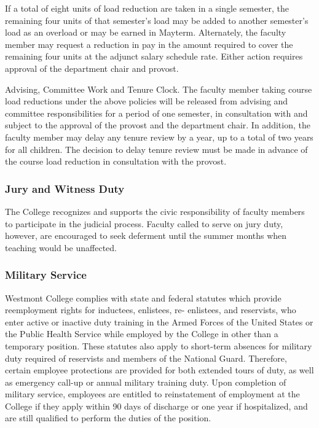 				If a total of eight units of load reduction are taken in a single semester, the remaining four units of that semester's load may be added to another semester's load as an overload or may be earned in Mayterm. Alternately, the faculty member may request a reduction in pay in the amount required to cover the remaining four units at the adjunct salary schedule rate. Either action requires approval of the department chair and provost.

				Advising, Committee Work and Tenure Clock.  The faculty member taking course load reductions under the above policies will be released from advising and committee responsibilities for a period of one semester, in consultation with and subject to the approval of the provost and the department chair. In addition, the faculty member may delay any tenure review by a year, up to a total of two years for all children.  The decision to delay tenure review must be made in advance of the course load reduction in consultation with the provost.

		\subsubsection{Jury and Witness Duty}
			The College recognizes and supports the civic responsibility of faculty members to participate in the judicial process.  Faculty called to serve on jury duty, however, are encouraged to seek deferment until the summer months when teaching would be unaffected.

		\subsubsection{Military Service}
			Westmont College complies with state and federal statutes which provide reemployment rights for inductees, enlistees, re- enlistees, and reservists, who enter active or inactive duty training in the Armed Forces of the United States or the Public Health Service while employed by the College in other than a temporary position.  These statutes also apply to short-term absences for military duty required of reservists and members of the National Guard.  Therefore, certain employee protections are provided for both extended tours of duty, as well as emergency call-up or annual military training duty.  Upon completion of military service, employees are entitled to reinstatement of employment at the College if they apply within 90 days of discharge or one year if hospitalized, and are still qualified to perform the duties of the position.

